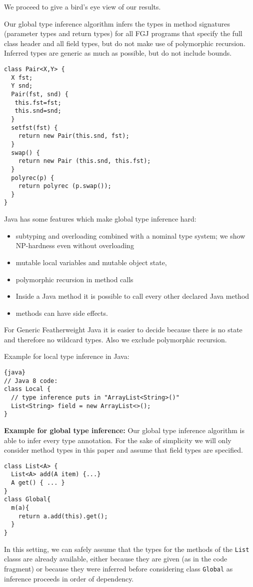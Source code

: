 We proceed to give a bird's eye view of our results.

Our global type inference algorithm infers the types in
method signatures (parameter types and return types) for all
FGJ programs that specify the full class header and all field types,
but do not make use of polymorphic recursion.
Inferred types are generic as much as possible, but do not include bounds.

\begin{lstlisting}
class Pair<X,Y> {
  X fst;
  Y snd;
  Pair(fst, snd) {
   this.fst=fst; 
   this.snd=snd;
  }
  setfst(fst) {
    return new Pair(this.snd, fst);
  }
  swap() {
    return new Pair (this.snd, this.fst);
  }
  polyrec(p) {
    return polyrec (p.swap());
  }
}
\end{lstlisting}

Java has some features which make global type inference hard:
\begin{itemize}
\item subtyping and overloading combined with a nominal type system;
  we show NP-hardness even without overloading
\item mutable local variables and mutable object state,
\item polymorphic recursion in method calls
\item Inside a Java method it is possible to call every other declared Java method
\item methods can have side effects.
\end{itemize}



For Generic Featherweight Java it is easier to decide because there is no state and therefore no wildcard types.
Also we exclude polymorphic recursion.

Example for local type inference in Java:
\begin{lstlisting}{java}
// Java 8 code:
class Local {
  // type inference puts in "ArrayList<String>()"
  List<String> field = new ArrayList<>();
}
\end{lstlisting}

\textbf{Example for global type inference:}
Our global type inference algorithm is able to infer every type annotation.
For the sake of simplicity we will only consider method types in this
paper and assume that field types are specified.
\begin{lstlisting}
class List<A> {
  List<A> add(A item) {...}
  A get() { ... }
}
class Global{
  m(a){
    return a.add(this).get();
  }
}
\end{lstlisting}
In this setting, we can safely assume that the types for the methods of the \lstinline{List} classs
are already available, either because they are given (as in the code
fragment) or because they were
inferred before considering class \lstinline{Global} as inference
proceeds in order of dependency.

